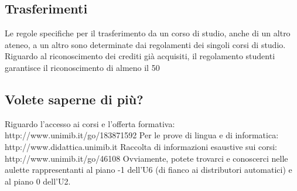 \subsection{Trasferimenti}
Le regole specifiche per il trasferimento da un corso di studio, anche di un altro ateneo, a un altro sono determinate dai regolamenti dei singoli corsi di studio. Riguardo al riconoscimento dei crediti già acquisiti, il regolamento studenti garantisce il riconoscimento di almeno il 50%

\subsection{Volete saperne di più?}
Riguardo l'accesso ai corsi e l'offerta formativa: http://www.unimib.it/go/183871592 
Per le prove di lingua e di informatica: http://www.didattica.unimib.it 
Raccolta di informazioni esaustive sui corsi: http://www.unimib.it/go/46108 
Ovviamente, potete trovarci e conoscerci nelle aulette rappresentanti al piano -1 dell'U6 (di fianco ai distributori automatici) e al piano 0 dell'U2. 

